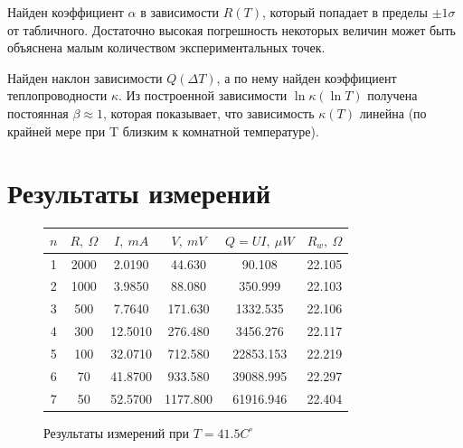 \documentclass[a4paper,12pt]{report}
\begin{document}
    Найден коэффициент $\alpha$ в зависимости $R(T)$, который попадает в пределы $\pm 1\sigma$ от табличного. Достаточно высокая погрешность некоторых величин может быть объяснена малым количеством экспериментальных точек.

    Найден наклон зависимости $Q(\Delta T)$, а по нему найден коэффициент теплопроводности $\kappa$. Из построенной зависимости $\ln \kappa (\ln T)$ получена постоянная $\beta\approx 1$, которая показывает, что зависимость $\kappa (T)$ линейна (по крайней мере при T близким к комнатной температуре).

    \appendix
    \vspace{-3cm}
    \chapter{Результаты измерений}
    \begin{figure}[H]
        \centering
        \begin{tabular}{|c|c|c|c|c|c|}
            \hline
            $n$ & $R,\ \Omega$ & $I, \ mA$ & $V,\ mV$ & $Q=UI,\ \mu W$ & $R_{w}, \ \Omega$ \\
            \hline
            1 & 2000 & 2.0190 & 44.630 & 90.108 & 22.105 \\
            \hline
            2 & 1000 & 3.9850 & 88.080 & 350.999 & 22.103 \\
            \hline
            3 & 500 & 7.7640 & 171.630 & 1332.535 & 22.106 \\
            \hline
            4 & 300 & 12.5010 & 276.480 & 3456.276 & 22.117 \\
            \hline
            5 & 100 & 32.0710 & 712.580 & 22853.153 & 22.219 \\
            \hline
            6 & 70 & 41.8700 & 933.580 & 39088.995 & 22.297 \\
            \hline
            7 & 50 & 52.5700 & 1177.800 & 61916.946 & 22.404 \\
            \hline
        \end{tabular}
        \caption{Результаты измерений при $T=41.5C^\circ$}
    \end{figure}
\end{document}
